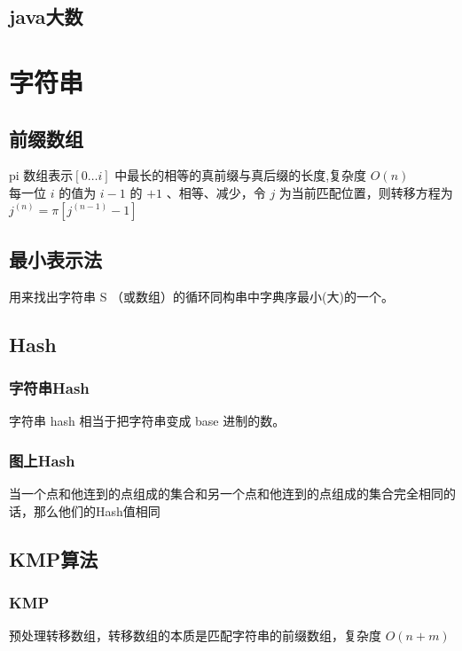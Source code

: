 \documentclass{probook}
\begin{document}
\section{java大数}



\chapter{字符串}
\section{前缀数组}
pi 数组表示$[0 \dots i]$ 中最长的相等的真前缀与真后缀的长度,复杂度 $O(n)$\\
每一位 $i$ 的值为 $i - 1$ 的 $+1$ 、相等、减少，令 $j$ 为当前匹配位置，则转移方程为 $j^{(n)} = \pi [j^{(n-1)}-1]$
 
\section{最小表示法}
用来找出字符串 S （或数组）的循环同构串中字典序最小(大)的一个。
 
\section{Hash}
\subsection{字符串Hash}
字符串 hash 相当于把字符串变成 base 进制的数。
 
\subsection{图上Hash}
当一个点和他连到的点组成的集合和另一个点和他连到的点组成的集合完全相同的话，那么他们的Hash值相同
 
\section{KMP算法} 
\subsection{KMP} 
预处理转移数组，转移数组的本质是匹配字符串的前缀数组，复杂度 $O(n + m)$
 
\end{document}
